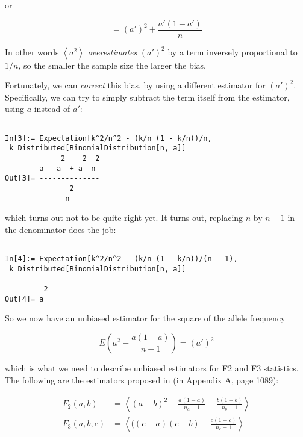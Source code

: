 \documentclass{article}
\begin{document}
or

\begin{equation}
=\left(a'\right)^2+\frac{a'(1-a')}{n}
\end{equation}

In other words \(\left\langle a^2\right\rangle\) \textit{ overestimates }\((a')^2\) by a term inversely proportional to \(1/n\), so the smaller the
sample size the larger the bias.

Fortunately, we can \textit{ correct} this bias, by using a different estimator for \((a')^2\). Specifically, we can try to simply subtract the term itself from the estimator, using \(a\) instead of \(a'\):

\begin{lstlisting}

In[3]:= Expectation[k^2/n^2 - (k/n (1 - k/n))/n,
 k Distributed[BinomialDistribution[n, a]]   
             2    2  2
        a - a  + a  n
Out[3]= --------------
               2
              n
\end{lstlisting}

which turns out not to be quite right yet. It turns out, replacing \(n\) by \(n-1\) in the denominator does the job:

\begin{lstlisting}

In[4]:= Expectation[k^2/n^2 - (k/n (1 - k/n))/(n - 1),                          
 k Distributed[BinomialDistribution[n, a]]                                   

         2
Out[4]= a
\end{lstlisting}

So we now have an unbiased estimator for the square of the allele frequency

\begin{equation}
\label{eq_freqSquare_unbiased}
E\left( a^2-\frac{a(1-a)}{n-1}\right) =\left(a'\right)^2
\end{equation}

which is what we need to describe unbiased estimators for F2 and F3 statistics. The following are the estimators proposed in \cite{Patterson2012-yq} (in Appendix A, page 1089):

\begin{align}
F_2(a,b) &= \left\langle (a-b)^2-\frac{a(1-a)}{n_a-1}-\frac{b(1-b)}{n_b-1}\right\rangle \\
F_3(a,b,c) &= \left\langle( (c-a)(c-b)-\frac{c(1-c)}{n_c-1}\right\rangle
\end{align}
\end{document}
